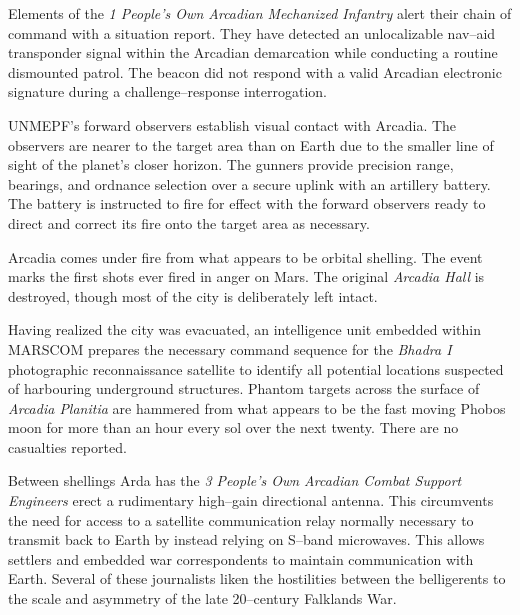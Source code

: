 

Elements of the {\it 1 People's Own Arcadian Mechanized Infantry} alert their chain of command with a situation report. They have detected an unlocalizable nav--aid transponder signal within the Arcadian demarcation while conducting a routine dismounted patrol. The beacon did not respond with a valid Arcadian electronic signature during a challenge--response interrogation.
\StopTimelineDate

UNMEPF's forward observers establish visual contact with Arcadia. The observers are nearer to the target area than on Earth due to the smaller line of sight of the planet's closer horizon. The gunners provide precision range, bearings, and ordnance selection over a secure uplink with an artillery battery. The battery is instructed to fire for effect with the forward observers ready to direct and correct its fire onto the target area as necessary.

Arcadia comes under fire from what appears to be orbital shelling. The event marks the first shots ever fired in anger on Mars. The original {\it Arcadia Hall} is destroyed, though most of the city is deliberately left intact. 

Having realized the city was evacuated, an intelligence unit embedded within MARSCOM prepares the necessary command sequence for the {\it Bhadra I} photographic reconnaissance satellite to identify all potential locations suspected of harbouring underground structures. Phantom targets across the surface of {\it Arcadia Planitia} are hammered from what appears to be the fast moving Phobos moon for more than an hour every sol over the next twenty. There are no casualties reported.

Between shellings Arda has the {\it 3 People's Own Arcadian Combat Support Engineers} erect a rudimentary high--gain directional antenna. This circumvents the need for access to a satellite communication relay normally necessary to transmit back to Earth by instead relying on S--band microwaves. This allows settlers and embedded war correspondents to maintain communication with Earth. Several of these journalists liken the hostilities between the belligerents to the scale and asymmetry of the late 20--century Falklands War.

